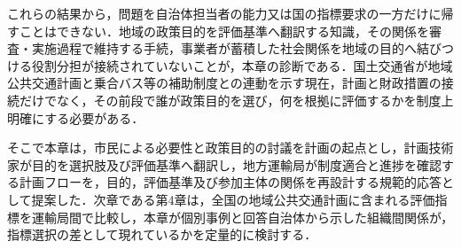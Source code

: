 これらの結果から，問題を自治体担当者の能力又は国の指標要求の一方だけに帰すことはできない．地域の政策目的を評価基準へ翻訳する知識，その関係を審査・実施過程で維持する手続，事業者が蓄積した社会関係を地域の目的へ結びつける役割分担が接続されていないことが，本章の診断である．国土交通省\cite{mlit2022}が地域公共交通計画と乗合バス等の補助制度との連動を示す現在，計画と財政措置の接続だけでなく，その前段で誰が政策目的を選び，何を根拠に評価するかを制度上明確にする必要がある．

そこで本章は，市民による必要性と政策目的の討議を計画の起点とし，計画技術家が目的を選択肢及び評価基準へ翻訳し，地方運輸局が制度適合と進捗を確認する計画フローを，目的，評価基準及び参加主体の関係を再設計する規範的応答として提案した．次章である第4章は，全国の地域公共交通計画に含まれる評価指標を運輸局間で比較し，本章が個別事例と回答自治体から示した組織間関係が，指標選択の差として現れているかを定量的に検討する．
